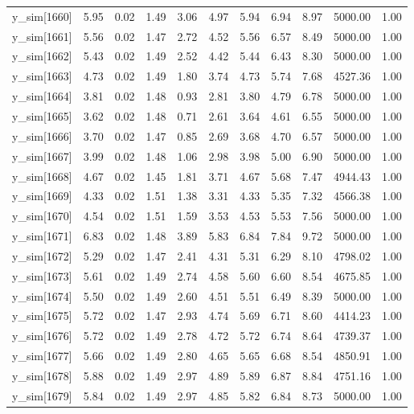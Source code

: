 \begin{table}[ht]
\begin{tabular}{rrrrrrrrrrr}
  y\_sim[1660] & 5.95 & 0.02 & 1.49 & 3.06 & 4.97 & 5.94 & 6.94 & 8.97 & 5000.00 & 1.00 \\ 
  y\_sim[1661] & 5.56 & 0.02 & 1.47 & 2.72 & 4.52 & 5.56 & 6.57 & 8.49 & 5000.00 & 1.00 \\ 
  y\_sim[1662] & 5.43 & 0.02 & 1.49 & 2.52 & 4.42 & 5.44 & 6.43 & 8.30 & 5000.00 & 1.00 \\ 
  y\_sim[1663] & 4.73 & 0.02 & 1.49 & 1.80 & 3.74 & 4.73 & 5.74 & 7.68 & 4527.36 & 1.00 \\ 
  y\_sim[1664] & 3.81 & 0.02 & 1.48 & 0.93 & 2.81 & 3.80 & 4.79 & 6.78 & 5000.00 & 1.00 \\ 
  y\_sim[1665] & 3.62 & 0.02 & 1.48 & 0.71 & 2.61 & 3.64 & 4.61 & 6.55 & 5000.00 & 1.00 \\ 
  y\_sim[1666] & 3.70 & 0.02 & 1.47 & 0.85 & 2.69 & 3.68 & 4.70 & 6.57 & 5000.00 & 1.00 \\ 
  y\_sim[1667] & 3.99 & 0.02 & 1.48 & 1.06 & 2.98 & 3.98 & 5.00 & 6.90 & 5000.00 & 1.00 \\ 
  y\_sim[1668] & 4.67 & 0.02 & 1.45 & 1.81 & 3.71 & 4.67 & 5.68 & 7.47 & 4944.43 & 1.00 \\ 
  y\_sim[1669] & 4.33 & 0.02 & 1.51 & 1.38 & 3.31 & 4.33 & 5.35 & 7.32 & 4566.38 & 1.00 \\ 
  y\_sim[1670] & 4.54 & 0.02 & 1.51 & 1.59 & 3.53 & 4.53 & 5.53 & 7.56 & 5000.00 & 1.00 \\ 
  y\_sim[1671] & 6.83 & 0.02 & 1.48 & 3.89 & 5.83 & 6.84 & 7.84 & 9.72 & 5000.00 & 1.00 \\ 
  y\_sim[1672] & 5.29 & 0.02 & 1.47 & 2.41 & 4.31 & 5.31 & 6.29 & 8.10 & 4798.02 & 1.00 \\ 
  y\_sim[1673] & 5.61 & 0.02 & 1.49 & 2.74 & 4.58 & 5.60 & 6.60 & 8.54 & 4675.85 & 1.00 \\ 
  y\_sim[1674] & 5.50 & 0.02 & 1.49 & 2.60 & 4.51 & 5.51 & 6.49 & 8.39 & 5000.00 & 1.00 \\ 
  y\_sim[1675] & 5.72 & 0.02 & 1.47 & 2.93 & 4.74 & 5.69 & 6.71 & 8.60 & 4414.23 & 1.00 \\ 
  y\_sim[1676] & 5.72 & 0.02 & 1.49 & 2.78 & 4.72 & 5.72 & 6.74 & 8.64 & 4739.37 & 1.00 \\ 
  y\_sim[1677] & 5.66 & 0.02 & 1.49 & 2.80 & 4.65 & 5.65 & 6.68 & 8.54 & 4850.91 & 1.00 \\ 
  y\_sim[1678] & 5.88 & 0.02 & 1.49 & 2.97 & 4.89 & 5.89 & 6.87 & 8.84 & 4751.16 & 1.00 \\ 
  y\_sim[1679] & 5.84 & 0.02 & 1.49 & 2.97 & 4.85 & 5.82 & 6.84 & 8.73 & 5000.00 & 1.00 \\ 

\end{tabular}
\end{table}
